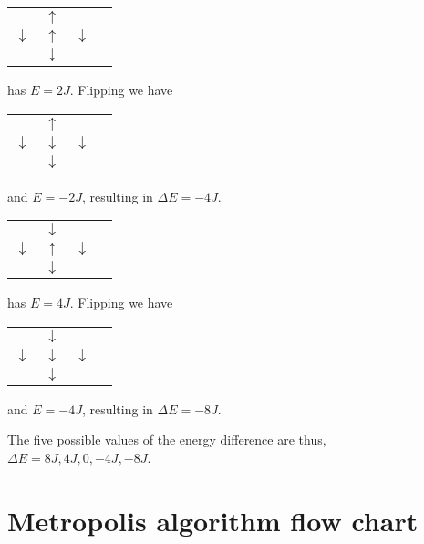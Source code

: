 \documentclass[english,notitlepage,reprint,nofootinbib]{revtex4-1}  %
\begin{document}
\begin{table}[H]
    \begin{tabular}{llll}
       & $\uparrow$ &    \\
    $\downarrow$ & $\uparrow$ & $\downarrow$ \\
       & $\downarrow$ &  
    \end{tabular}
    has $E = 2J$. Flipping we have 
    \begin{tabular}{llll}
        & $\uparrow$ &    \\
     $\downarrow$ & $\downarrow$ & $\downarrow$ \\
        & $\downarrow$ &  
     \end{tabular}
     and $E = -2J$, resulting in $\Delta E = -4J$.
\end{table}

\begin{table}[H]
    \begin{tabular}{llll}
       & $\downarrow$ &    \\
    $\downarrow$ & $\uparrow$ & $\downarrow$ \\
       & $\downarrow$ &  
    \end{tabular}
    has $E = 4J$. Flipping we have 
    \begin{tabular}{llll}
        & $\downarrow$ &    \\
     $\downarrow$ & $\downarrow$ & $\downarrow$ \\
        & $\downarrow$ &  
     \end{tabular}
     and $E = -4J$, resulting in $\Delta E = -8J$.
\end{table}
The five possible values of the energy difference are thus, $\Delta E = 8J, 4J, 0, -4J, -8J$.

\section{Metropolis algorithm flow chart}\label{appendix:C}
\end{document}
